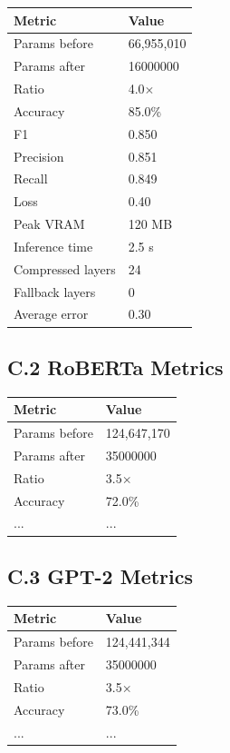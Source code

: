 \begin{table}[H]
\centering
\small
\begin{tabular}{ll}
\toprule
\textbf{Metric} & \textbf{Value} \\
\midrule
Params before & 66,955,010 \\
Params after & 16000000 \\
Ratio & 4.0$\times$ \\
Accuracy & 85.0\% \\
F1 & 0.850 \\
Precision & 0.851 \\
Recall & 0.849 \\
Loss & 0.40 \\
Peak VRAM & 120 MB \\
Inference time & 2.5 s \\
Compressed layers & 24 \\
Fallback layers & 0 \\
Average error & 0.30 \\
\bottomrule
\end{tabular}
\end{table}

\subsection{C.2 RoBERTa Metrics}

\begin{table}[H]
\centering
\small
\begin{tabular}{ll}
\toprule
\textbf{Metric} & \textbf{Value} \\
\midrule
Params before & 124,647,170 \\
Params after & 35000000 \\
Ratio & 3.5$\times$ \\
Accuracy & 72.0\% \\
... & ... \\
\bottomrule
\end{tabular}
\end{table}

\subsection{C.3 GPT-2 Metrics}

\begin{table}[H]
\centering
\small
\begin{tabular}{ll}
\toprule
\textbf{Metric} & \textbf{Value} \\
\midrule
Params before & 124,441,344 \\
Params after & 35000000 \\
Ratio & 3.5$\times$ \\
Accuracy & 73.0\% \\
... & ... \\
\bottomrule
\end{tabular}
\end{table}

